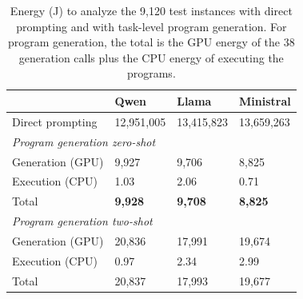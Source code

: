 \begin{table}[t]
\centering
\caption{Energy (J) to analyze the 9,120 test instances with direct prompting and with task-level program generation. For program generation, the total is the GPU energy of the 38 generation calls plus the CPU energy of executing the programs.}
\label{tab:rq4_pot_energy}
\begin{tabularx}{\columnwidth}{lXXX}
\toprule
 & Qwen & Llama & Ministral \\
\midrule
Direct prompting & 12,951,005 & 13,415,823 & 13,659,263 \\
\midrule
\multicolumn{4}{l}{\textit{Program generation zero-shot}} \\
\quad Generation (GPU) & 9,927 & 9,706 & 8,825 \\
\quad Execution (CPU) & 1.03 & 2.06 & 0.71 \\
\quad Total & \textbf{9,928} & \textbf{9,708} & \textbf{8,825} \\
\midrule
\multicolumn{4}{l}{\textit{Program generation two-shot}} \\
\quad Generation (GPU) & 20,836 & 17,991 & 19,674 \\
\quad Execution (CPU) & 0.97 & 2.34 & 2.99 \\
\quad Total & 20,837 & 17,993 & 19,677 \\
\bottomrule
\end{tabularx}
\end{table}
